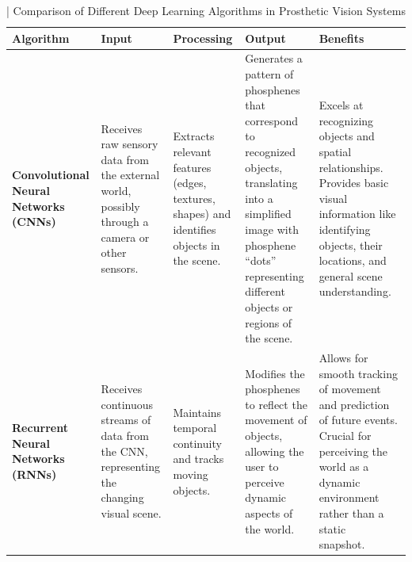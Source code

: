 \documentclass[twocolumn,10pt]{article}
\begin{document}

\begin{table}[ht!]
      \centering
      \fontsize{8pt}{10pt}\selectfont
      \caption{| Comparison of Different Deep Learning Algorithms in Prosthetic Vision Systems}\label{tab:dl_algorithms_prosthetic_vision}
      \begin{tabularx}{\textwidth}{|X|X|X|X|X|}
            \hline
            \textbf{Algorithm}                                                                                                                                                                           & \textbf{Input} & \textbf{Processing} & \textbf{Output} & \textbf{Benefits} \\ \hline

            \textbf{Convolutional Neural Networks (CNNs)}                                                                                                                                                &
            Receives raw sensory data from the external world, possibly through a camera or other sensors.                                                                                               &
            Extracts relevant features (edges, textures, shapes) and identifies objects in the scene.                                                                                                    &
            Generates a pattern of phosphenes that correspond to recognized objects, translating into a simplified image with phosphene ``dots'' representing different objects or regions of the scene. &
            Excels at recognizing objects and spatial relationships. Provides
            basic visual information like identifying objects, their locations,
            and general scene understanding.\
            \\ \hline

            \textbf{Recurrent Neural Networks (RNNs)}                                                                                                                                                    &
            Receives continuous streams of data from the CNN, representing the changing visual scene.                                                                                                    &
            Maintains temporal continuity and tracks moving objects.                                                                                                                                     &
            Modifies the phosphenes to reflect the movement of objects, allowing the user to perceive dynamic aspects of the world.                                                                      &
            Allows for smooth tracking of movement and prediction of future
            events. Crucial for perceiving the world as a dynamic environment
            rather than a static snapshot.\
            \\ \hline


\end{tabularx}
\end{table}
\end{document}
